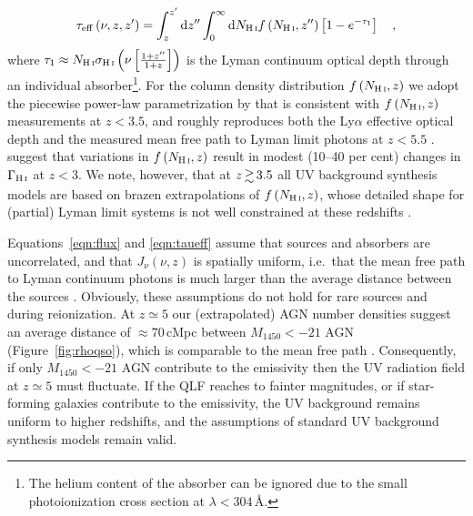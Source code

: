 \documentclass[fleqn,usenatbib]{mnras}
\begin{document}
\begin{equation}
  \tau_\mathrm{eff}\left(\nu,z,z^\prime\right) = \int_{z}^{z^\prime}\mathrm{d}z^{\prime\prime}\int_0^\infty
  \mathrm{d}N_\ion{H}{i} f\left(N_\ion{H}{i},z^{\prime\prime}\right)\left[1-e^{-\tau_1}\right]\quad,
   \label{eqn:taueff}
\end{equation}
where $\tau_1\approx N_\ion{H}{i}\sigma_\ion{H}{i}\left(\nu\left[\frac{1+z^{\prime\prime}}{1+z}\right]\right)$
is the Lyman continuum optical depth through an individual absorber\footnote{The helium content of the
absorber can be ignored due to the small  photoionization cross section at $\lambda<304$\,\AA.}.
For the  column density distribution $f\left(N_\ion{H}{i},z\right)$ we adopt the piecewise power-law
parametrization by \citet{2012ApJ...746..125H} that is consistent with $f\left(N_\ion{H}{i},z\right)$
measurements at $z<3.5$, and roughly reproduces both the  Ly$\alpha$ effective optical depth
\citep[but not in detail -- see][]{2015MNRAS.450.4081P,2017MNRAS.464..897B,2017ApJ...837..106O}
and the measured mean free path to  Lyman limit photons at $z<5.5$ \citep{2009ApJ...705L.113P,2014MNRAS.445.1745W}.
\citet{2018arXiv180109693K} suggest that variations in $f\left(N_\ion{H}{i},z\right)$ result in modest
(10--40 per cent) changes in $\Gamma_\ion{H}{i}$ at $z<3$. We note, however, that at $z\ga 3.5$
all UV background synthesis models are based on brazen extrapolations of $f\left(N_\ion{H}{i},z\right)$,
whose detailed shape for (partial) Lyman limit systems is not well constrained at these redshifts \citep{2010ApJ...718..392P}.

Equations~\eqref{eqn:flux} and \eqref{eqn:taueff} assume that sources and absorbers are uncorrelated,
and that $J_\nu(\nu, z)$ is spatially uniform, i.e.\ that the mean free path to  Lyman continuum
photons is much larger than the average distance between the sources
\citep[e.g.][]{1999ApJ...514..648M,2004MNRAS.350.1107M,2009ApJ...703.1416F,2012ApJ...746..125H}.
Obviously, these assumptions do not hold for rare sources and during  reionization.
At $z\simeq 5$ our (extrapolated) AGN number densities suggest an average distance of
$\approx 70$\,cMpc between $M_{1450}<-21$ AGN (Figure~\ref{fig:rhoqso}), which is comparable
to the mean free path \citep[$83\pm 10$\,cMpc,][]{2014MNRAS.445.1745W}.
Consequently, if only $M_{1450}<-21$ AGN contribute to the emissivity then the UV radiation field at $z\simeq 5$ must fluctuate.
If the QLF reaches to fainter magnitudes, or if star-forming galaxies contribute to the emissivity, the UV background remains
uniform to higher redshifts, and the assumptions of standard UV background synthesis models remain valid.
\end{document}
